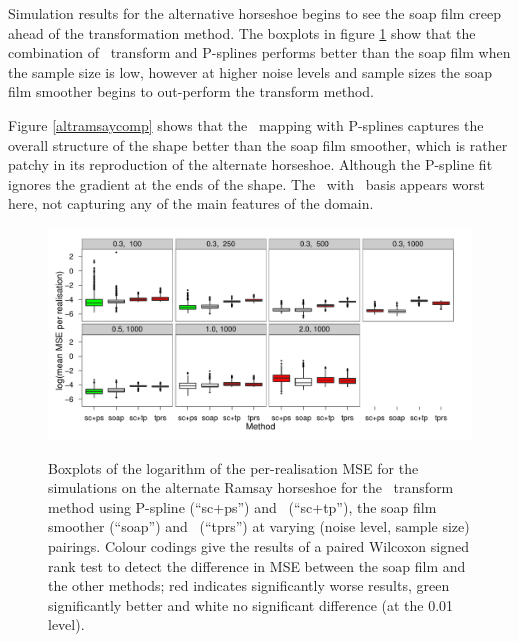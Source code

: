 Simulation results for the alternative horseshoe begins to see the soap film creep ahead of the transformation method. The boxplots in figure \ref{sc-altram-boxplot} show that the combination of \sch\ transform and P-splines performs better than the soap film when the sample size is low, however at higher noise levels and sample sizes the soap film smoother begins to out-perform the transform method.

Figure \ref{altramsaycomp} shows that the \sch\ mapping with P-splines captures the overall structure of the shape better than the soap film smoother, which is rather patchy in its reproduction of the alternate horseshoe. Although the P-spline fit ignores the gradient at the ends of the shape. The \sch\ with \tprs\ basis appears worst here, not capturing any of the main features of the domain.

\begin{figure}
\centering
\includegraphics{sc/tablecode/altramsay-boxplot.pdf} \\
\caption{Boxplots of the logarithm of the per-realisation MSE for the simulations on the alternate Ramsay horseshoe for the \sch\ transform method using P-spline (``sc+ps'') and \tprss\ (``sc+tp''), the soap film smoother (``soap'') and \tprss\ (``tprs'') at varying (noise level, sample size) pairings. Colour codings give the results of a paired Wilcoxon signed rank test to detect the difference in MSE between the soap film and the other methods; red indicates significantly worse results, green significantly better and white no significant difference (at the 0.01 level).}
\label{sc-altram-boxplot}
\end{figure}


